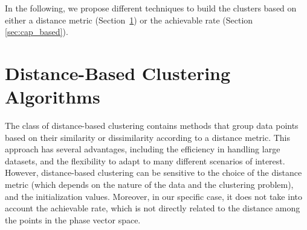 In the following, we propose different techniques to build the clusters based on either a {distance metric} (Section~\ref{sec:dist_based}) or the {achievable rate}  (Section \ref{sec:cap_based}).

\section{Distance-Based Clustering Algorithms}
\label{sec:dist_based}
The class of distance-based clustering contains methods that group data points based on their similarity or dissimilarity according to a distance metric. 
This approach has several advantages, including the efficiency in handling large datasets, and the flexibility to adapt to many different scenarios of interest. 
However, distance-based clustering can be sensitive to the choice of the distance metric (which depends on the nature of the data and the clustering problem), and the initialization values. Moreover, in our specific case, it does not take into account the achievable rate, which is not directly related to the distance among the points in the phase vector space. 

